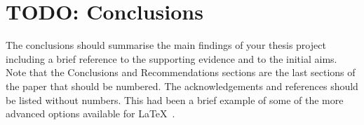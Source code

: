 \documentclass[]{aiaa-tc}%
\begin{document}

%
%
\section{TODO: Conclusions}
The conclusions should summarise the main findings of your thesis project including a brief reference to the supporting evidence and to the initial aims. Note that the Conclusions and Recommendations sections are the last sections of the paper that should be numbered. The acknowledgements and references should be listed without numbers.
This had been a brief example of some of the more advanced options available for \LaTeX\ .
%
%
%
\end{document}
